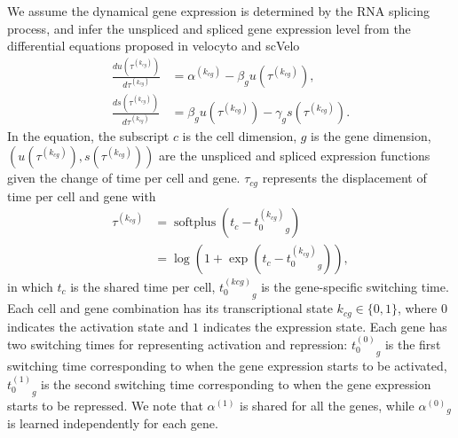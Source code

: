 \documentclass[
  sn-mathphys-num,
  lineno,
  twocolumn]{sn-jnl}
\begin{document}
We assume the dynamical gene expression is determined by the RNA
splicing process, and infer the unspliced and spliced gene expression
level from the differential equations proposed in velocyto
\citep{La_Manno2018-lj} and scVelo \citep{Bergen2020-pj} \begin{align}
\frac{d u\left(\tau^{\left(k_{cg}\right)}\right)}{d \tau^{\left(k_{cg}\right)}}
  &= \alpha^{\left(k_{cg}\right)}-\beta_g u\left(\tau^{\left(k_{cg}\right)}\right),
   \label{eq-dudt}\\
\frac{d s\left(\tau^{\left(k_{cg}\right)}\right)}{d \tau^{\left(k_{cg}\right)}}
  &= \beta_g u\left(\tau^{\left(k_{cg}\right)}\right)
  -\gamma_g s\left(\tau^{\left(k_{cg}\right)}\right). \label{eq-dsdt}
\end{align} In the equation, the subscript \(c\) is the cell dimension,
\(g\) is the gene dimension,
\(\left( u\left( \tau^{(k_{cg})} \right), s\left( \tau^{(k_{cg})} \right) \right)\)
are the unspliced and spliced expression functions given the change of
time per cell and gene. \(\tau_{cg}\) represents the displacement of
time per cell and gene with \begin{align}
 \tau^{(k_{cg})} &= \operatorname{softplus} \left( t_{c} - {t_{0}^{(k_{cg})}}_g \right) \\
 & = \log( 1 + \exp (t_c - {t_{0}^{(k_{cg})}}_g)), 
\end{align} in which \(t_c\) is the shared time per cell,
\({t_{0}^{(kcg)}}_g\) is the gene-specific switching time. Each cell and
gene combination has its transcriptional state
\(k_{cg} \in \{ 0, 1 \}\), where \(0\) indicates the activation state
and \(1\) indicates the expression state. Each gene has two switching
times for representing activation and repression: \({t_{0}^{(0)}}_g\) is
the first switching time corresponding to when the gene expression
starts to be activated, \({t_0^{(1)}}_g\) is the second switching time
corresponding to when the gene expression starts to be repressed. We
note that \(\alpha^{(1)}\) is shared for all the genes, while
\({\alpha^{(0)}}_g\) is learned independently for each gene.
\end{document}
